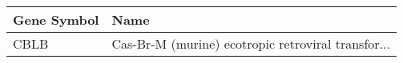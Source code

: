 \begin{tabular}{ll}
\toprule
Gene Symbol &                                               Name \\
\midrule
       CBLB & Cas-Br-M (murine) ecotropic retroviral transfor... \\
\bottomrule
\end{tabular}
